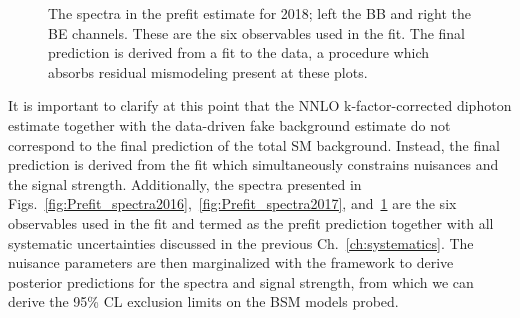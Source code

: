 \begin{figure}[!htbp]{
\caption{The \mgg spectra in the prefit estimate for 2018; left the BB and right the BE channels.
These are the six observables used in the fit.
The final prediction is derived from a fit to the data, a procedure which absorbs residual mismodeling present at these plots.
}
\label{fig:Prefit_spectra2018}}
\end{figure}

It is important to clarify at this point that the NNLO k-factor-corrected diphoton estimate together with the data-driven fake background estimate do not correspond to the final prediction of the total SM background. Instead, the final prediction is derived from the fit which simultaneously constrains nuisances and the signal strength. Additionally, the \mgg spectra presented in Figs.~\ref{fig:Prefit_spectra2016},~\ref{fig:Prefit_spectra2017}, and~\ref{fig:Prefit_spectra2018}  are the six observables used in the fit and termed as the prefit prediction together with all systematic uncertainties discussed in the previous Ch.~\ref{ch:systematics}. The nuisance parameters are then marginalized with the \THETA framework to derive posterior predictions for the \mgg spectra and signal strength, from which we can derive the 95\% CL exclusion limits on the BSM models probed. %


